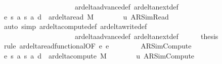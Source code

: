 \begin{isabellebody}
\ \ \ \ \ \ \ \ \ \ \ \ \ \ \ \ \ \ \ \ \ ar{\isacharunderscore}{\kern0pt}delta{\isacharunderscore}{\kern0pt}advance{\isacharunderscore}{\kern0pt}def\ ar{\isacharunderscore}{\kern0pt}delta{\isacharunderscore}{\kern0pt}next{\isacharunderscore}{\kern0pt}def{\isacharparenright}{\kern0pt}\isanewline
\ \ \ \ \isamarkupfalse%
\ e{}{\isacharcolon}{\kern0pt}\ {\isachardoublequoteopen}{\isacharparenleft}{\kern0pt}s{\isacharcomma}{\kern0pt}\ a{\isacharcomma}{\kern0pt}\ s{}{\isacharcomma}{\kern0pt}\ a{}{\isacharcomma}{\kern0pt}\ d{}{\isacharparenright}{\kern0pt}\ {\isasymin}\ ar{\isacharunderscore}{\kern0pt}delta{\isacharunderscore}{\kern0pt}read\ M{\isachardoublequoteclose}\isanewline
\ \ \ \ \ \ \isamarkupfalse%
\ u{}\ AR{\isacharunderscore}{\kern0pt}SimRead\isanewline
\ \ \ \ \ \ \isamarkupfalse%
\ {\isacharparenleft}{\kern0pt}auto\ simp{\isacharcolon}{\kern0pt}\ ar{\isacharunderscore}{\kern0pt}delta{\isacharunderscore}{\kern0pt}compute{\isacharunderscore}{\kern0pt}def\ ar{\isacharunderscore}{\kern0pt}delta{\isacharunderscore}{\kern0pt}write{\isacharunderscore}{\kern0pt}def\isanewline
\ \ \ \ \ \ \ \ \ \ \ \ \ \ \ \ \ \ \ \ \ ar{\isacharunderscore}{\kern0pt}delta{\isacharunderscore}{\kern0pt}advance{\isacharunderscore}{\kern0pt}def\ ar{\isacharunderscore}{\kern0pt}delta{\isacharunderscore}{\kern0pt}next{\isacharunderscore}{\kern0pt}def{\isacharparenright}{\kern0pt}\isanewline
\ \ \ \ \isamarkupfalse%
\ {\isacharquery}{\kern0pt}thesis\ \isamarkupfalse%
\ {\isacharparenleft}{\kern0pt}rule\ ar{\isacharunderscore}{\kern0pt}delta{\isacharunderscore}{\kern0pt}read{\isacharunderscore}{\kern0pt}functional{\isacharbrackleft}{\kern0pt}OF\ e{}\ e{}{\isacharbrackright}{\kern0pt}{\isacharparenright}{\kern0pt}\isanewline
\ \ \isamarkupfalse%
\isanewline
\ \ \ \ \isamarkupfalse%
\ AR{\isacharunderscore}{\kern0pt}SimCompute\isanewline
\ \ \ \ \isamarkupfalse%
\ e{}{\isacharcolon}{\kern0pt}\ {\isachardoublequoteopen}{\isacharparenleft}{\kern0pt}s{\isacharcomma}{\kern0pt}\ a{\isacharcomma}{\kern0pt}\ s{}{\isacharcomma}{\kern0pt}\ a{}{\isacharcomma}{\kern0pt}\ d{}{\isacharparenright}{\kern0pt}\ {\isasymin}\ ar{\isacharunderscore}{\kern0pt}delta{\isacharunderscore}{\kern0pt}compute\ M{\isachardoublequoteclose}\isanewline
\ \ \ \ \ \ \isamarkupfalse%
\ u{}\ AR{\isacharunderscore}{\kern0pt}SimCompute\isanewline

\end{isabellebody}
